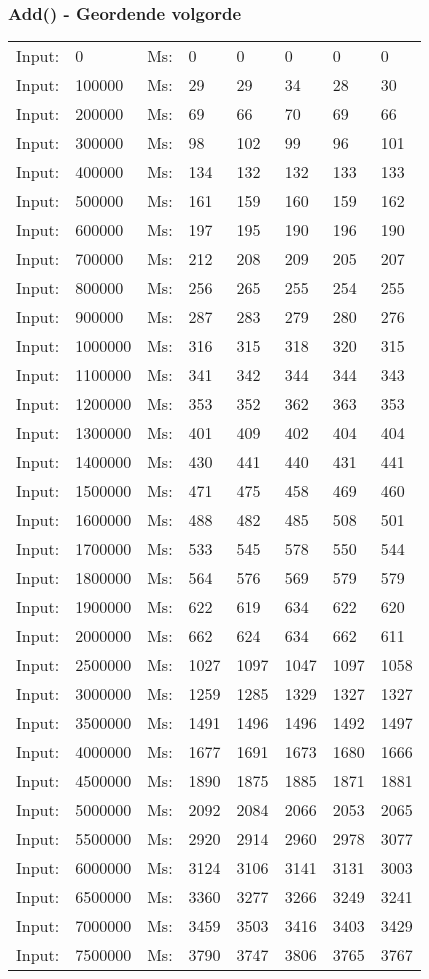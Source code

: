 \documentclass[11pt,a4paper]{report}
\begin{document}
\begin{tiny}
\subsubsection*{Add() - Geordende volgorde}
\begin{tabular}{l l ||l  l  l  l  l  l}
Input:&0&Ms:&0&0&0&0&0\\
Input:&100000&Ms:&29&29&34&28&30\\
Input:&200000&Ms:&69&66&70&69&66\\
Input:&300000&Ms:&98&102&99&96&101\\
Input:&400000&Ms:&134&132&132&133&133\\
Input:&500000&Ms:&161&159&160&159&162\\
Input:&600000&Ms:&197&195&190&196&190\\
Input:&700000&Ms:&212&208&209&205&207\\
Input:&800000&Ms:&256&265&255&254&255\\
Input:&900000&Ms:&287&283&279&280&276\\
Input:&1000000&Ms:&316&315&318&320&315\\
Input:&1100000&Ms:&341&342&344&344&343\\
Input:&1200000&Ms:&353&352&362&363&353\\
Input:&1300000&Ms:&401&409&402&404&404\\
Input:&1400000&Ms:&430&441&440&431&441\\
Input:&1500000&Ms:&471&475&458&469&460\\
Input:&1600000&Ms:&488&482&485&508&501\\
Input:&1700000&Ms:&533&545&578&550&544\\
Input:&1800000&Ms:&564&576&569&579&579\\
Input:&1900000&Ms:&622&619&634&622&620\\
Input:&2000000&Ms:&662&624&634&662&611\\
Input:&2500000&Ms:&1027&1097&1047&1097&1058\\
Input:&3000000&Ms:&1259&1285&1329&1327&1327\\
Input:&3500000&Ms:&1491&1496&1496&1492&1497\\
Input:&4000000&Ms:&1677&1691&1673&1680&1666\\
Input:&4500000&Ms:&1890&1875&1885&1871&1881\\
Input:&5000000&Ms:&2092&2084&2066&2053&2065\\
Input:&5500000&Ms:&2920&2914&2960&2978&3077\\
Input:&6000000&Ms:&3124&3106&3141&3131&3003\\
Input:&6500000&Ms:&3360&3277&3266&3249&3241\\
Input:&7000000&Ms:&3459&3503&3416&3403&3429\\
Input:&7500000&Ms:&3790&3747&3806&3765&3767\\
\end{tabular}
\\

\end{tiny}
\end{document}
